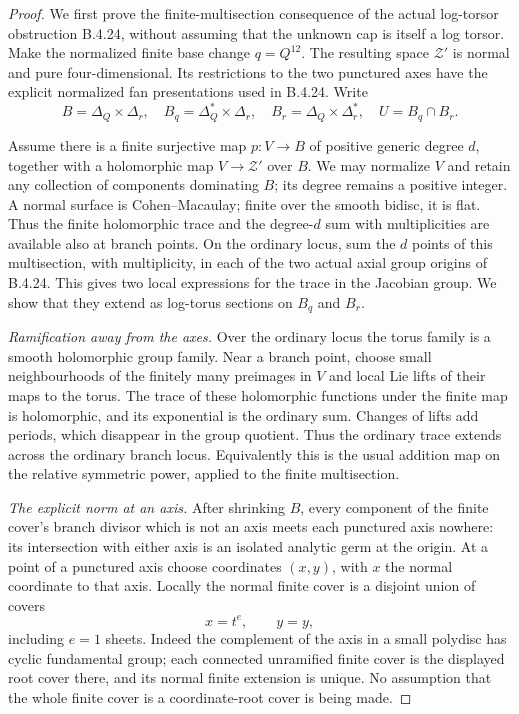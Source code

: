 \begin{proof}
We first prove the finite-multisection consequence of
the actual log-torsor obstruction B.4.24, without
assuming that the unknown cap is itself a log torsor.
Make the normalized finite base change $q=Q^{12}$.
The resulting space $\mathcal Z'$ is normal and
pure four-dimensional. Its restrictions to the two
punctured axes have the explicit normalized fan
presentations used in B.4.24. Write
\[
 B=\Delta_Q\times\Delta_r,\quad
 B_q=\Delta_Q^*\times\Delta_r,\quad
 B_r=\Delta_Q\times\Delta_r^*,\quad
 U=B_q\cap B_r.
\]

Assume there is a finite surjective map
$p:V\to B$ of positive generic degree $d$, together
with a holomorphic map $V\to\mathcal Z'$ over $B$.
We may normalize $V$ and retain any collection of
components dominating $B$; its degree remains a
positive integer. A normal surface is Cohen--Macaulay;
finite over the smooth bidisc, it is flat. Thus the
finite holomorphic trace and the degree-$d$ sum with
multiplicities are available also at branch points.
On the ordinary locus, sum the
$d$ points of this multisection, with multiplicity,
in each of the two actual axial group origins of
B.4.24. This gives two local expressions for the
trace in the Jacobian group. We show that they
extend as log-torus sections on $B_q$ and $B_r$.

\emph{Ramification away from the axes.}
Over the ordinary locus the torus family is a smooth
holomorphic group family. Near a branch point, choose
small neighbourhoods of the finitely many preimages
in $V$ and local Lie lifts of their maps to the torus.
The trace of these holomorphic functions under the
finite map is holomorphic, and its exponential is
the ordinary sum. Changes of lifts add periods,
which disappear in the group quotient. Thus the
ordinary trace extends across the ordinary branch
locus. Equivalently this is the usual addition map
on the relative symmetric power, applied to the
finite multisection.

\emph{The explicit norm at an axis.}
After shrinking $B$, every component of the finite
cover's branch divisor which is not an axis meets
each punctured axis nowhere: its intersection with
either axis is an isolated analytic germ at the
origin. At a point of a punctured axis choose
coordinates $(x,y)$, with $x$ the normal coordinate
to that axis. Locally the normal finite cover is
a disjoint union of covers
\[
 x=t^e,\qquad y=y,
 \tag{B.4.26.1}
\]
including $e=1$ sheets. Indeed the complement of
the axis in a small polydisc has cyclic fundamental
group; each connected unramified finite cover is
the displayed root cover there, and its normal
finite extension is unique. No assumption that the
whole finite cover is a coordinate-root cover is
being made.


\end{proof}
